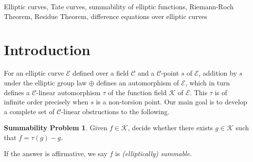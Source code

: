 \documentclass[preprint,12pt]{elsarticle}
\numberwithin{equation}{section} %
\theoremstyle{theorem}
\theoremstyle{definition}
\newtheorem*{sumprob}{Summability Problem}
\newcommand{\Ca}{\mathcal{C}} %
\newcommand{\bk}{\mathcal{K}} %
\newcommand{\ec}{\mathcal{E}} %
\begin{document}
\begin{frontmatter}
\begin{abstract}
\end{abstract}

\begin{keyword}
    Elliptic curves, Tate curves, summability of elliptic functions, Riemann-Roch Theorem, Residue Theorem, difference equations over elliptic curves
\end{keyword}

\end{frontmatter}

\tableofcontents

\section{Introduction} 
\vspace{-.04in}
For an elliptic curve $\ec$ defined over a field $\Ca$ and a $\Ca$-point $s$ of $\ec$, addition by $s$ under the elliptic group law $\oplus$ defines an automorphism of $\ec$, which in turn defines a $\Ca$-linear automorphism $\tau$ of the function field $\bk$ of $\ec$. This $\tau$ is of infinite order precisely when $s$ is a non-torsion point. Our main goal is to develop a complete set of $\Ca$-linear obstructions to the following. \vspace{-.02in}
\begin{sumprob}
    Given $f\in \bk$, decide whether there exists $g\in\bk$ such that $f=\tau(g)-g$. \vspace{-.02in}
\end{sumprob} 
\noindent If the answer is affirmative, we say $f$ is \emph{(elliptically) summable}.
\end{document}
